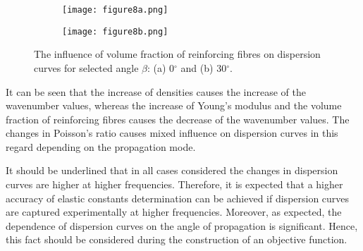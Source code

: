 \documentclass[preprint,12pt]{elsarticle}
\begin{document}
\begin{figure} [h!]
	\centering
	\begin{subfigure}[b]{0.49\textwidth}
		\centering
		\texttt{[image: figure8a.png]}
		\caption{}
		\label{fig:vol0}
	\end{subfigure}
	\hfill
	\begin{subfigure}[b]{0.49\textwidth}
		\centering
		\texttt{[image: figure8b.png]}
		\caption{}
		\label{fig:vol30}
	\end{subfigure}
	\caption{The influence of volume fraction of reinforcing fibres on dispersion curves 
	for selected angle \(\beta\): (a) 0\(^{\circ}\) and (b) 30\(^{\circ}\).} 
	\label{fig:vol}
\end{figure}

It can be seen that the increase of densities causes the increase of the wavenumber values, whereas the increase of  Young's modulus and the volume fraction of reinforcing fibres causes the decrease of the wavenumber values. The changes in Poisson's ratio causes mixed influence on dispersion curves in this regard depending on the propagation mode.

It should be underlined that in all cases considered the changes in dispersion curves are higher at higher frequencies. Therefore, it is expected that a higher accuracy of elastic constants determination can be achieved if dispersion curves are captured experimentally at higher frequencies. Moreover, as expected, the dependence of dispersion curves on the angle of propagation is significant. Hence, this fact should be considered during the construction of an objective function.
\end{document}

